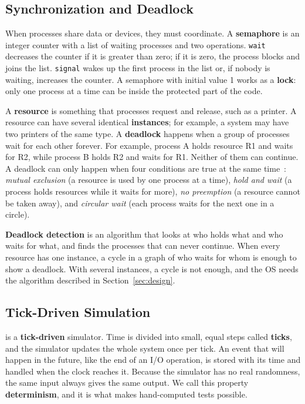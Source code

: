 \subsection{Synchronization and Deadlock}
When processes share data or devices, they must coordinate. A \textbf{semaphore} is an integer counter with a list of waiting processes and two operations. \texttt{wait} decreases the counter if it is greater than zero; if it is zero, the process blocks and joins the list. \texttt{signal} wakes up the first process in the list or, if nobody is waiting, increases the counter. A semaphore with initial value 1 works as a \textbf{lock}: only one process at a time can be inside the protected part of the code.

A \textbf{resource} is something that processes request and release, such as a printer. A resource can have several identical \textbf{instances}; for example, a system may have two printers of the same type. A \textbf{deadlock} happens when a group of processes wait for each other forever. For example, process A holds resource R1 and waits for R2, while process B holds R2 and waits for R1. Neither of them can continue. A deadlock can only happen when four conditions are true at the same time~\cite[Sec.~8.3]{silberschatz}: \emph{mutual exclusion} (a resource is used by one process at a time), \emph{hold and wait} (a process holds resources while it waits for more), \emph{no preemption} (a resource cannot be taken away), and \emph{circular wait} (each process waits for the next one in a circle).

\textbf{Deadlock detection} is an algorithm that looks at who holds what and who waits for what, and finds the processes that can never continue. When every resource has one instance, a cycle in a graph of who waits for whom is enough to show a deadlock. With several instances, a cycle is not enough, and the OS needs the algorithm described in Section~\ref{sec:design}.

\subsection{Tick-Driven Simulation}
\ossim{} is a \textbf{tick-driven} simulator. Time is divided into small, equal steps called \textbf{ticks}, and the simulator updates the whole system once per tick. An event that will happen in the future, like the end of an I/O operation, is stored with its time and handled when the clock reaches it. Because the simulator has no real randomness, the same input always gives the same output. We call this property \textbf{determinism}, and it is what makes hand-computed tests possible.
